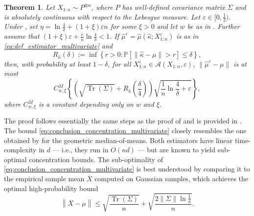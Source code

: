 \documentclass{article}
\theoremstyle{plain}
\newtheorem{theorem}{Theorem}[section]
\theoremstyle{definition}
\def\eps{\varepsilon}
\DeclareMathOperator{\tr}{Tr}
\renewcommand{\Pr}{\mathbb{P}}
\def\sA{\mathcal{A}}
\begin{document}
\begin{theorem}\label{thm:multivariate_concentration_adv}
Let $X_{1:n}\sim P^{\otimes n}$, where \( P \) has well-defined covariance matrix \( \Sigma\)  and is absolutely continuous with respect to the Lebesgue measure. Let \( \eps \in [0,\frac{1}{2}) \). Under , set $\eta = \ln\frac{4}{\delta}+(1+\xi )\eps n $ for some \( \xi>0 \) and let \( w \) be as in . Further assume that \( (1+\xi)\eps + \frac{\overline{c}}{n}\ln \frac{4}{\delta } < 1 \). If $\widehat{\mu}^\eps  =  \widehat{\mu}(\widehat{\kappa };X_{1:n}^\eps) $ is as in \eqref{eq:def_estimator_multivariate} and 
\[
  R_{\widehat{\kappa }}(\delta) := \inf\left\{r>0 : \Pr\left[\lVert\widehat{\kappa }- \mu\rVert > r\right] \leq \delta \right\},
\]
then, with probability at least $1-\delta $, for all \( X_{1:n}^\varepsilon \in \sA(X_{1:n},\varepsilon ) \), \( \lVert \widehat{\mu }^\varepsilon -\mu   \rVert  \) is at most  
  \begin{equation}\label{eq:conclusion_concentration_multivariate}
    C^M_{w,\xi }\left\{ \left(\sqrt{\tr(\Sigma)}+ R_{\widehat{\kappa } }\left(\frac{\delta}{4}\right)\right) \sqrt{\frac{1}{n}\ln \frac{4}{\delta } + \varepsilon }  \right\},
  \end{equation}
where \( C^M_{w,\xi } \) is a constant depending only on \( w \) and \( \xi  \).
\end{theorem}
The proof follows essentially the same steps as the proof of  and is provided in . The bound \eqref{eq:conclusion_concentration_multivariate} closely resembles the one obtained by \cite{minsker2015geometric} for the geometric median-of-means. Both estimators have linear time-complexity in $d$ --- i.e., they run in $O(nd)$ --- but are known to yield sub-optimal concentration bounds. The sub-optimality of \eqref{eq:conclusion_concentration_multivariate} is best understood by comparing it to the empirical sample mean $\overline{X}$ computed on Gaussian samples, which achieves the optimal high-probability bound
\begin{equation}\label{eq:multivariate_bound_optimal}
\left\lVert \overline{X} - \mu \right\rVert \le \sqrt{\frac{\tr(\Sigma)}{n}} + \sqrt{\frac{2 \lVert \Sigma\rVert \ln \frac{1}{\delta}}{n}}.
\end{equation}
\end{document}
